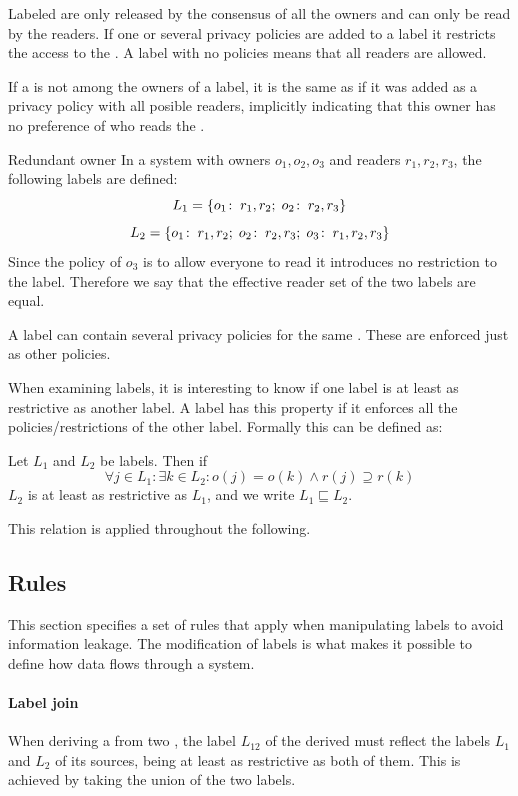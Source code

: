 Labeled \xvalues{} are only released by the consensus of all the owners and can only be read by the readers.
If one or several privacy policies are added to a label it restricts the access to the \xvalue{}.
A label with no policies  means that all readers are allowed.

If a \principal{} is not among the owners of a label, it is the same as if it was added as a privacy policy with all posible readers, implicitly indicating that this owner has no preference of who reads the \xvalue{}.

\begin{example}{Redundant owner}
In a system with owners $o_1, o_2, o_3$ and readers $r_1, r_2, r_3$, the following labels are defined:
$$L_1 = \{o_1\!:\;r_1,r_2;\; o_2\!:\;r_2, r_3\}$$
$$L_2 = \{o_1\!:\;r_1,r_2;\; o_2\!:\;r_2, r_3;\; o_3\!:\;r_1, r_2, r_3\}$$
Since the policy of $o_3$ is to allow everyone to read it introduces no restriction to the label.
Therefore we say that the effective reader set of the two labels are equal.
\end{example}

A label can contain several privacy policies for the same \principal{}.
These are enforced just as other policies.

When examining labels, it is interesting to know if one label is at least as restrictive as another label.
A label has this property if it enforces all the policies/restrictions of the other label.
Formally this can be defined as:

\begin{definition}\label{dlm:def:restrict}
  Let $L_1$ and $L_2$ be labels.
  Then if
  $$\forall j \in L_1 : \exists k \in L_2 : o(j) = o(k) \wedge r(j) \supseteq r(k)$$
  $L_2$ is at least as restrictive as $L_1$, and we write $L_1 \sqsubseteq L_2$.
\end{definition}

This relation is applied throughout the following.

\subsection{Rules}
This section specifies a set of rules that apply when manipulating labels to avoid information leakage.
The modification of labels is what makes it possible to define how data flows through a system.

\paragraph{Label join}
When deriving a \xvalue{} from two \xvalues{}, the label $L_{12}$ of the derived \xvalue{} must reflect the labels $L_1$ and $L_2$ of its sources, being at least as restrictive as both of them.
This is achieved by taking the union of the two labels.

